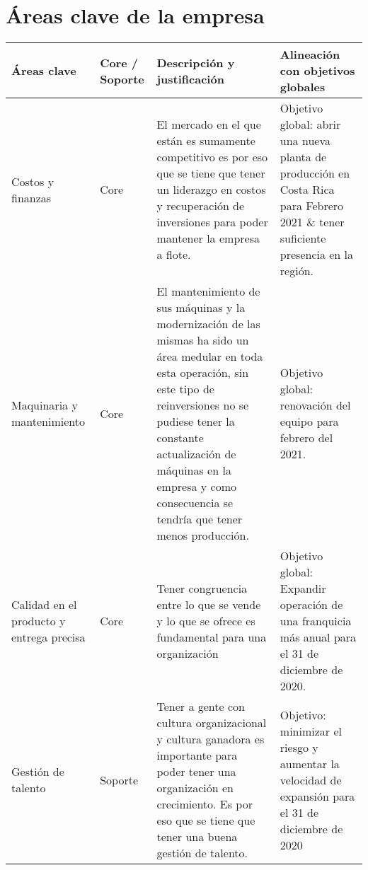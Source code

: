 \documentclass{article}
\begin{document}
\section{Áreas clave de la empresa}
\begin{center}
    \begin{supertabular}{ |p{2cm}|p{2cm}|p{5.5cm}|p{5.5cm}| }
        \hline
            Áreas clave 
            & Core / Soporte 
            & Descripción y justificación 
            & Alineación con objetivos globales \\ 
        \hline
            Costos y finanzas 
            & Core 
            & El mercado en el que están es sumamente competitivo es por eso que se tiene que tener un liderazgo en costos y recuperación de inversiones para poder mantener la empresa a flote. 
            & Objetivo global: abrir una nueva planta de producción en Costa Rica para Febrero 2021 \& tener suficiente presencia en la región.
            \\ 
        \hline
            Maquinaria y mantenimiento 
            & Core 
            & El mantenimiento de sus máquinas y la modernización de las mismas ha sido un área medular en toda esta operación, sin este tipo de reinversiones no se pudiese tener la constante actualización de máquinas en la empresa y como consecuencia se tendría que tener menos producción. 
            & Objetivo global: renovación del equipo para febrero del 2021. \\ 
        \hline
            Calidad en el producto y entrega precisa 
            & Core 
            & Tener congruencia entre lo que se vende y lo que se ofrece es fundamental para una organización 
            & Objetivo global: Expandir operación de una franquicia más anual para el 31 de diciembre de 2020. \\ 
        \hline
            Gestión de talento 
            & Soporte 
            & Tener a gente con cultura organizacional y cultura ganadora es importante para poder tener una organización en crecimiento. Es por eso que se tiene que tener una buena gestión de talento.
            & Objetivo: minimizar el riesgo y aumentar la velocidad de expansión para el 31 de diciembre de 2020 \\ 
        \hline
    \end{supertabular}
\end{center}
\end{document}
